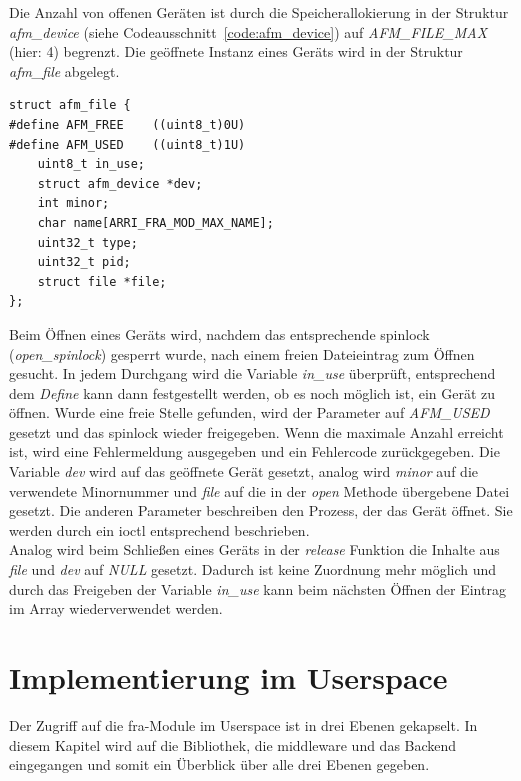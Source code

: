 Die Anzahl von offenen Geräten ist durch die Speicherallokierung in der Struktur \textit{afm\_device} (siehe Codeausschnitt~\ref{code:afm_device}) auf \textit{AFM\_FILE\_MAX} (hier: 4) begrenzt. Die geöffnete Instanz eines Geräts wird in der Struktur \textit{afm\_file} abgelegt.

\begin{lstfloat}
\begin{lstlisting}
struct afm_file {  
#define AFM_FREE    ((uint8_t)0U)
#define AFM_USED    ((uint8_t)1U)
	uint8_t in_use;
	struct afm_device *dev;
	int minor;
	char name[ARRI_FRA_MOD_MAX_NAME];
	uint32_t type;
	uint32_t pid;
	struct file *file;
};
\end{lstlisting}
\end{lstfloat}

Beim Öffnen eines Geräts wird, nachdem das entsprechende \gls{spinlock} (\textit{open\_spinlock}) gesperrt wurde, nach einem freien Dateieintrag zum Öffnen gesucht. In jedem Durchgang wird die Variable \textit{in\_use} überprüft, entsprechend dem \textit{Define} kann dann festgestellt werden, ob es noch möglich ist, ein Gerät zu öffnen. Wurde eine freie Stelle gefunden, wird der Parameter auf \textit{AFM\_USED} gesetzt und das \gls{spinlock} wieder freigegeben.
Wenn die maximale Anzahl erreicht ist, wird eine Fehlermeldung ausgegeben und ein Fehlercode zurückgegeben.
Die Variable \textit{dev} wird auf das geöffnete Gerät gesetzt, analog wird \textit{minor} auf die verwendete Minornummer und \textit{file} auf die in der \textit{open} Methode übergebene Datei gesetzt. 
Die anderen Parameter beschreiben den Prozess, der das Gerät öffnet. Sie werden durch ein \ac{ioctl} entsprechend beschrieben.\\

Analog wird beim Schließen eines Geräts in der \textit{release} Funktion die Inhalte aus \textit{file} und \textit{dev} auf \textit{NULL} gesetzt. Dadurch ist keine Zuordnung mehr möglich und durch das Freigeben der Variable \textit{in\_use} kann beim nächsten Öffnen der Eintrag im Array wiederverwendet werden.


\section{Implementierung im Userspace}\label{sec:user}
Der Zugriff auf die \ac{fra}-Module im Userspace ist in drei Ebenen gekapselt. In diesem Kapitel wird auf die Bibliothek, die \gls{middleware} und das Backend eingegangen und somit ein Überblick über alle drei Ebenen gegeben.



